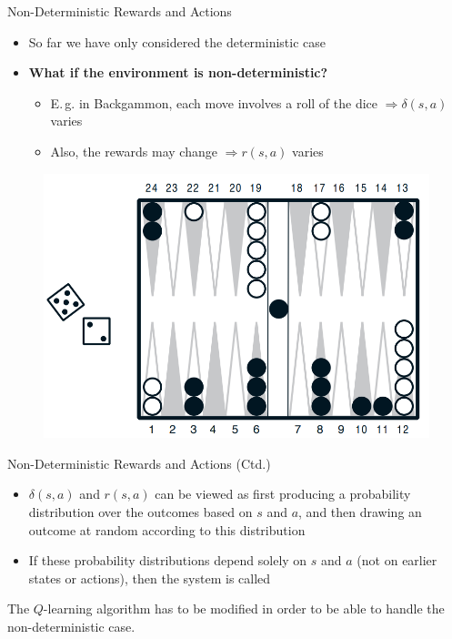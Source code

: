 \begin{frame}{Non-Deterministic Rewards and Actions}{}
	\begin{itemize}
		\item So far we have only considered the deterministic case
		\item \textbf{What if the environment is non-deterministic?}
		\begin{itemize}
			\item E.\,g. in Backgammon, each move involves a roll of the dice $\Rightarrow \delta(s, a)$ varies
			\item Also, the rewards may change $\Rightarrow r(s, a)$ varies
		\end{itemize}
	\end{itemize}

	\begin{figure}
		\centering
		\includegraphics[scale=0.2]{14_rl/02_img/backgammon}
	\end{figure}
\end{frame}


\begin{frame}{Non-Deterministic Rewards and Actions (Ctd.)}{}
	\begin{itemize}
		\item $\delta(s, a)$ and $r(s, a)$ can be viewed as first producing a probability distribution over the outcomes based
			on $s$ and $a$, and then drawing an outcome at random according to this distribution
		\item If these probability distributions depend solely on $s$ and $a$ (not on earlier states or actions), then
			the system is called 
	\end{itemize}

	\vspace*{2mm}
	\begin{boxBlueNoFrame}
		The $Q$-learning algorithm has to be modified in order to be able to handle the non-deterministic case.
	\end{boxBlueNoFrame}
\end{frame}


